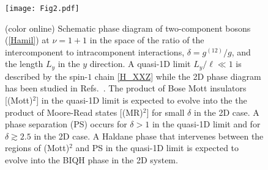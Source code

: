 \documentclass[aps,prb,twocolumn,superscriptaddress,showpacs,floatfix]{revtex4-1}
\begin{document}
\begin{figure}
\texttt{[image: Fig2.pdf]}
\caption{(color online) Schematic phase diagram of two-component bosons (\ref{Hamil}) at $\nu=1+1$ in the space of the ratio of the intercomponent to intracomponent interactions, $\delta=g^{(12)}/g$, and the length $L_y$ in the $y$ direction. 
A quasi-1D limit $L_y/\ell\ll 1$ is described by the spin-$1$ chain \eqref{H_XXZ} 
while the 2D phase diagram has been studied in Refs.~. 
The product of Bose Mott insulators [(Mott)$^2$] in the quasi-1D limit is expected to evolve into the the product of Moore-Read states [(MR)$^2$] for small $\delta$ in the 2D case. 
A phase separation (PS) occurs for $\delta>1$ in the quasi-1D limit and for $\delta\gtrsim 2.5$ in the 2D case. 
A Haldane phase that intervenes between the regions of (Mott)$^2$ and PS in the quasi-1D limit is expected to evolve into the BIQH phase in the 2D system. }
\label{fig_phase}
\end{figure}
\end{document}

